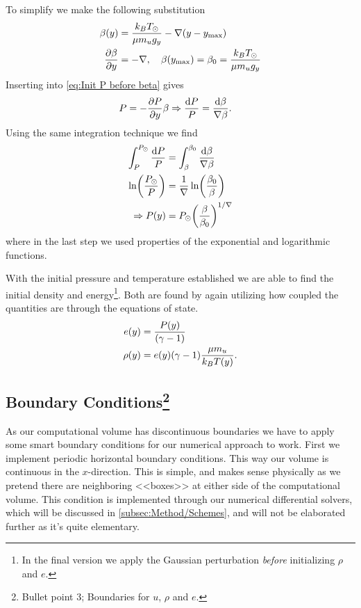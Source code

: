 \documentclass[11pt,a4paper,twocolumn,titlepage]{article}
\begin{document}
To simplify we make the following substitution
\begin{align*}
\beta(y) &= \frac{k_BT_\odot}{\mu m_u g_y}-\nabla(y-y_\text{max})
\\
\pdv{\beta}{y} &= -\nabla \qc \beta(y_\text{max}) = \beta_0 = \frac{k_BT_\odot}{\mu m_u g_y}
\end{align*}
Inserting into \cref{eq:Init P before beta} gives
\begin{align*}
P &= -\pdv{P}{y}\beta \Rightarrow \frac{\dd{P}}{P} = \frac{\dd{\beta}}{\nabla \beta}.
\end{align*}
Using the same integration technique we find
\begin{align}
\int_P^{P_\odot} \frac{\dd{P}}{P} &= \int_\beta^{\beta_0}\frac{\dd{\beta}}{\nabla\beta} \notag
\\
\ln(\frac{P_\odot}{P}) &= \frac{1}{\nabla}\ln(\frac{\beta_0}{\beta}) \notag
\\
\Rightarrow P(y) &= P_\odot \qty(\frac{\beta}{\beta_0})^{1/\nabla} \label{eq:Initial P}
\end{align}
where in the last step we used properties of the exponential and logarithmic functions.

With the initial pressure and temperature established we are able to find the initial density and energy\footnote{In the final version we apply the Gaussian perturbation \textit{before} initializing $\rho$ and $e$.}. Both are found by again utilizing how coupled the quantities are through the equations of state. 
\begin{align}
e(y) &= \frac{P(y)}{(\gamma-1)} \label{eq:Initial e}
\\
\rho(y) &= e(y)\qty(\gamma-1)\frac{\mu m_u}{k_BT(y)}. \label{eq:Initial rho}
\end{align}

\subsection[Boundary Conditions]{Boundary Conditions\protect\footnote{Bullet point 3; Boundaries for $u$, $\rho$ and $e$.}}\label{subsec:Governing/Boundary}
As our computational volume has discontinuous boundaries we have to apply some smart boundary conditions for our numerical approach to work. First we implement periodic horizontal boundary conditions. This way our volume is continuous in the $x$-direction. This is simple, and makes sense physically as we pretend there are neighboring <<boxes>> at either side of the computational volume. This condition is implemented through our numerical differential solvers, which will be discussed in \ref{subsec:Method/Schemes}, and will not be elaborated further as it's quite elementary.
\end{document}
